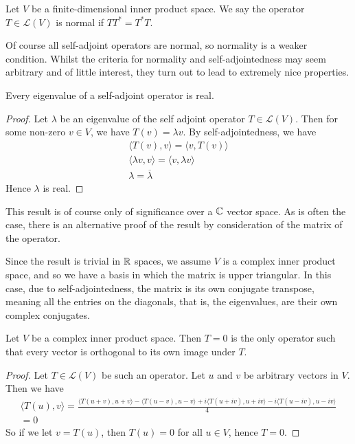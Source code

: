 \documentclass[]{article}
\begin{document}
\begin{defi} 
		Let $V$	be a finite-dimensional inner product space. We say the operator $T \in \mathcal{L}(V)$ is normal if $TT^* = T^*T$.
\end{defi}

Of course all self-adjoint operators are normal, so normality is a weaker condition. Whilst the criteria for normality and self-adjointedness may seem arbitrary and of little interest, they turn out to lead to extremely nice properties. 

\begin{thm} \label{thm:self-adjoint-real-eigenvalues}
		Every eigenvalue of a self-adjoint operator is real.
\end{thm}

\begin{proof}
		Let $\lambda$ be an eigenvalue of the self adjoint operator $T \in \mathcal{L}(V)$. Then for some non-zero $v \in V$, we have $T(v) = \lambda v$. By self-adjointedness, we have
		\begin{align*}
				\langle T(v), v \rangle = \langle v, T(v) \rangle  \\
				\langle \lambda v, v \rangle = \langle v, \lambda v \rangle \\
		\lambda = \overline{\lambda}
		\end{align*}
		Hence $\lambda$ is real.
\end{proof}

This result is of course only of significance over a $\mathbb{C}$ vector space. As is often the case, there is an alternative proof of the result by consideration of the matrix of the operator. 

Since the result is trivial in $\mathbb{R}$ spaces, we assume $V$ is a complex inner product space, and so we have a basis in which the matrix is upper triangular. In this case, due to self-adjointedness, the matrix is its own conjugate transpose, meaning all the entries on the diagonals, that is, the eigenvalues, are their own complex conjugates.

\begin{thm}
		Let $V$ be a complex inner product space. Then $T = 0$ is the only operator such that every vector is orthogonal to its own image under $T$.
\end{thm}

\begin{proof}
		Let $T \in \mathcal{L}(V)$ be such an operator. Let $u$ and $v$ be arbitrary vectors in $V$. Then we have
		\begin{align*}
				\langle T(u), v \rangle = \frac{\langle T(u+v), u+v \rangle - \langle T(u-v), u-v \rangle + i \langle T(u+iv), u+iv \rangle - i \langle T(u-iv), u -iv \rangle }{4} \\
				= 0
		\end{align*}
		So if we let $v = T(u)$, then $T(u) = 0$ for all $u \in V$, hence $T = 0$.
\end{proof}
\end{document}
